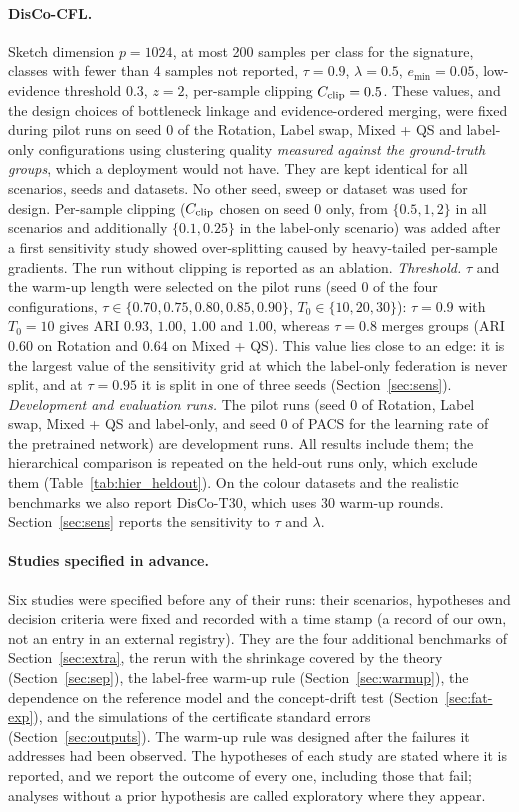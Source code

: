 \paragraph{DisCo-CFL.} Sketch dimension $p=1024$, at most 200 samples per class for the signature, classes with fewer than 4 samples not reported, $\tau=0.9$, $\lambda=0.5$, $e_{\min}=0.05$, low-evidence threshold $0.3$, $z=2$, per-sample clipping $C_{\rm clip}=0.5$. These values, and the design choices of bottleneck linkage and evidence-ordered merging, were fixed during pilot runs on seed 0 of the Rotation, Label swap, Mixed + QS and label-only configurations using clustering quality \emph{measured against the ground-truth groups}, which a deployment would not have. They are kept identical for all scenarios, seeds and datasets. No other seed, sweep or dataset was used for design. Per-sample clipping ($C_{\rm clip}$ chosen on seed 0 only, from $\{0.5,1,2\}$ in all scenarios and additionally $\{0.1,0.25\}$ in the label-only scenario) was added after a first sensitivity study showed over-splitting caused by heavy-tailed per-sample gradients. The run without clipping is reported as an ablation. \emph{Threshold.} $\tau$ and the warm-up length were selected on the pilot runs (seed 0 of the four configurations, $\tau\in\{0.70,0.75,0.80,0.85,0.90\}$, $T_0\in\{10,20,30\}$): $\tau=0.9$ with $T_0=10$ gives ARI $0.93$, $1.00$, $1.00$ and $1.00$, whereas $\tau=0.8$ merges groups (ARI $0.60$ on Rotation and $0.64$ on Mixed + QS). This value lies close to an edge: it is the largest value of the sensitivity grid at which the label-only federation is never split, and at $\tau=0.95$ it is split in one of three seeds (Section~\ref{sec:sens}). \emph{Development and evaluation runs.} The pilot runs (seed 0 of Rotation, Label swap, Mixed + QS and label-only, and seed 0 of PACS for the learning rate of the pretrained network) are development runs. All results include them; the hierarchical comparison is repeated on the held-out runs only, which exclude them (Table~\ref{tab:hier_heldout}). On the colour datasets and the realistic benchmarks we also report DisCo-T30, which uses 30 warm-up rounds. Section~\ref{sec:sens} reports the sensitivity to $\tau$ and $\lambda$.

\paragraph{Studies specified in advance.} Six studies were specified before any of their runs: their scenarios, hypotheses and decision criteria were fixed and recorded with a time stamp (a record of our own, not an entry in an external registry). They are the four additional benchmarks of Section~\ref{sec:extra}, the rerun with the shrinkage covered by the theory (Section~\ref{sec:sep}), the label-free warm-up rule (Section~\ref{sec:warmup}), the dependence on the reference model and the concept-drift test (Section~\ref{sec:fat-exp}), and the simulations of the certificate standard errors (Section~\ref{sec:outputs}). The warm-up rule was designed after the failures it addresses had been observed. The hypotheses of each study are stated where it is reported, and we report the outcome of every one, including those that fail; analyses without a prior hypothesis are called exploratory where they appear.

